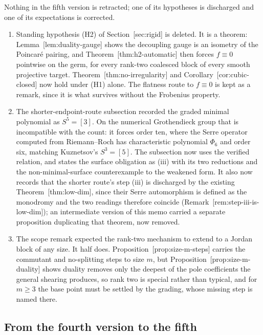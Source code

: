 \documentclass[11pt]{article}
\theoremstyle{definition}
\theoremstyle{remark}
\begin{document}
Nothing in the fifth version is retracted; one of its hypotheses is discharged
and one of its expectations is corrected.

\begin{enumerate}
\item Standing hypothesis (H2) of Section~\textup{[sec:rigid]} is deleted. It is a
  theorem: Lemma~\textup{[lem:duality-gauge]} shows the decoupling gauge is an
  isometry of the Poincar\'e pairing, and Theorem~\textup{[thm:h2-automatic]} then
  forces $f\equiv0$ pointwise on the germ, for every rank-two coalesced block of
  every smooth projective target. Theorem~\textup{[thm:no-irregularity]} and
  Corollary~\textup{[cor:cubic-closed]} now hold under (H1) alone. The flatness route
  to $f\equiv0$ is kept as a remark, since it is what survives without the
  Frobenius property.
\item The shorter-endpoint-route subsection recorded the graded minimal
  polynomial as $S^5=[3]$. On the numerical Grothendieck group that is
  incompatible with the count: it forces order ten, where the Serre operator
  computed from Riemann--Roch has characteristic polynomial $\Phi_6$ and order
  six, matching Kuznetsov's $S^3=[5]$. The subsection now uses the verified
  relation, and states the surface obligation as (iii) with its two reductions
  and the non-minimal-surface counterexample to the weakened form. It also now
  records that the shorter route's step (iii) is discharged by the existing
  Theorem~\textup{[thm:low-dim]}, since their Serre automorphism is defined as the
  monodromy and the two readings therefore coincide
  (Remark~\textup{[rem:step-iii-is-low-dim]}); an intermediate version of this memo
  carried a separate proposition duplicating that theorem, now removed.
\item The scope remark expected the rank-two mechanism to extend to a Jordan
  block of any size. It half does. Proposition~\textup{[prop:size-m-steps]} carries
  the commutant and no-splitting steps to size $m$, but
  Proposition~\textup{[prop:size-m-duality]} shows duality removes only the deepest
  of the pole coefficients the general shearing produces, so rank two is special
  rather than typical, and for $m\ge3$ the base point must be settled by the
  grading, whose missing step is named there.
\end{enumerate}

\subsection*{From the fourth version to the fifth}
\end{document}
